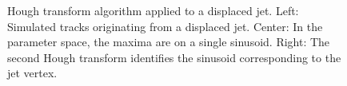 \documentclass{JINST}
\begin{document}
\begin{figure}[!Hhtb]
\begin{center}
  \caption{Hough transform algorithm applied to a displaced jet. Left: Simulated tracks originating from a
    displaced jet. Center: In the parameter space, the maxima are on a single sinusoid. Right: The
    second Hough transform identifies the sinusoid corresponding to the jet vertex.
    \label{fig:DisplacedJet}}
\end{center}
\end{figure}
\end{document}
